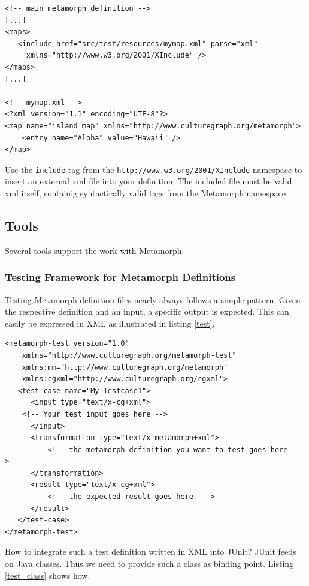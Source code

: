 \documentclass[12pt,a4paper]{article}
\begin{document}
\begin{lstlisting}[float=htb, label=xinclude,caption=Including further XML files into a metamorph definition.]
<!-- main metamorph definition -->				
[...]
<maps>
   <include href="src/test/resources/mymap.xml" parse="xml"
	 xmlns="http://www.w3.org/2001/XInclude" />
</maps>
[...]

<!-- mymap.xml -->
<?xml version="1.1" encoding="UTF-8"?>
<map name="island_map" xmlns="http://www.culturegraph.org/metamorph">
	<entry name="Aloha" value="Hawaii" />
</map>
\end{lstlisting}
Use the {\tt include} tag from the {\tt http://www.w3.org/2001/XInclude} namespace to insert an external xml file into your definition. The included file must be valid xml itself, containig syntactically valid tags from the Metamorph namespace.

\subsection{Tools}

Several tools support the work with Metamorph.

\subsubsection{Testing Framework for Metamorph Definitions}

Testing Metamorph definition files nearly always follows a simple pattern. Given the respective definition and an input, a specific output is expected. This can easily be expressed in XML as illustrated in listing \ref{test}.

\begin{lstlisting}[float=htb, label=test,caption=XML test definition]
<metamorph-test version="1.0"
	xmlns="http://www.culturegraph.org/metamorph-test" 
	xmlns:mm="http://www.culturegraph.org/metamorph"
	xmlns:cgxml="http://www.culturegraph.org/cgxml">
   <test-case name="My Testcase1">
      <input type="text/x-cg+xml">
	<!-- Your test input goes here -->           
      </input>
      <transformation type="text/x-metamorph+xml">
          <!-- the metamorph definition you want to test goes here  -->   
      </transformation>
      <result type="text/x-cg+xml">
          <!-- the expected result goes here  -->  
      </result>
   </test-case>
</metamorph-test>
\end{lstlisting}

How to integrate such a test definition written in XML into JUnit? JUnit feeds on Java classes. Thus we need to provide such a class as binding point. Listing  \ref{test_class} shows how.
\end{document}
